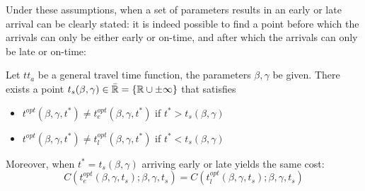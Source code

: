 Under these assumptions, when a set of parameters results in an early or late arrival can be clearly stated:
it is indeed possible to find a point before which the arrivals can only be either early or on-time,
and after which the arrivals can only be late or on-time:

\begin{prop}
  Let \(tt_a\) be a general travel time function, the parameters \(\beta, \gamma\) be given.
  There exists a point \(t_s(\beta, \gamma) \in \bar{\mathbb{R}} = \{\mathbb{R} \cup \pm \infty\}\) that satisfies
  \begin{itemize}
  \item \(t^{opt}(\beta, \gamma, t^*) \neq t_e^{opt}(\beta, \gamma, t^*)\) if \(t^* > t_s(\beta, \gamma)\)
  \item \(t^{opt}(\beta, \gamma, t^*) \neq t_l^{opt}(\beta, \gamma, t^*)\) if \(t^* < t_s(\beta, \gamma)\)
  \end{itemize}

  Moreover, when \(t^* = t_s(\beta, \gamma)\) arriving early or late yields the same cost:
  \begin{equation*}
    C(t_e^{opt}(\beta, \gamma, t_s); \beta, \gamma, t_s) = C(t_l^{opt}(\beta, \gamma, t_s); \beta, \gamma, t_s)
  \end{equation*}
\end{prop}
